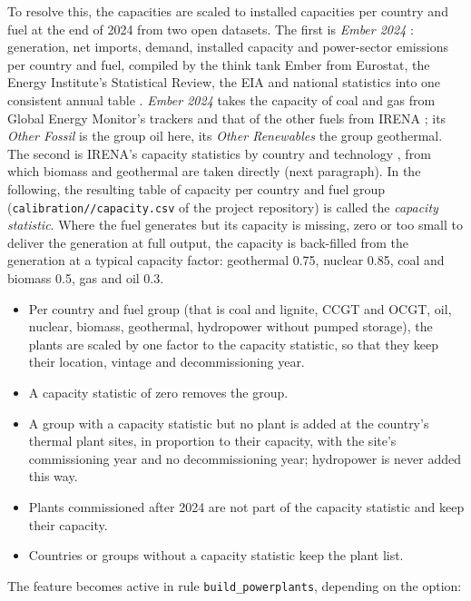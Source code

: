 To resolve this, the capacities are scaled to installed capacities per country and fuel at the end of 2024 from two open datasets.
The first is \textit{Ember 2024} \citep{ember2025}: generation, net imports, demand, installed capacity and power-sector emissions per country and fuel, compiled by the think tank Ember from Eurostat, the Energy Institute's Statistical Review, the EIA and national statistics into one consistent annual table \citep{embermethod}.
\textit{Ember 2024} takes the capacity of coal and gas from Global Energy Monitor's trackers \citep{gem} and that of the other fuels from IRENA \citep{embermethod}; its \emph{Other Fossil} is the group oil here, its \emph{Other Renewables} the group geothermal.
The second is IRENA's capacity statistics by country and technology \citep{irenastat}, from which biomass and geothermal are taken directly (next paragraph).
In the following, the resulting table of capacity per country and fuel group (\texttt{calibration//\allowbreak capacity.csv} of the project repository) is called the \emph{capacity statistic}.
Where the fuel generates but its capacity is missing, zero or too small to deliver the generation at full output, the capacity is back-filled from the generation at a typical capacity factor: geothermal 0.75, nuclear 0.85, coal and biomass 0.5, gas and oil 0.3.

\begin{itemize}[nosep,leftmargin=*]
  \item Per country and fuel group (that is coal and lignite, CCGT and OCGT, oil, nuclear, biomass, geothermal, hydropower without pumped storage), the plants are scaled by one factor to the capacity statistic, so that they keep their location, vintage and decommissioning year.
  \item A capacity statistic of zero removes the group.
  \item A group with a capacity statistic but no plant is added at the country's thermal plant sites, in proportion to their capacity, with the site's commissioning year and no decommissioning year; hydropower is never added this way.
  \item Plants commissioned after 2024 are not part of the capacity statistic and keep their capacity.
  \item Countries or groups without a capacity statistic keep the plant list.
\end{itemize}
The feature becomes active in rule \texttt{build\_powerplants}, depending on the option:



